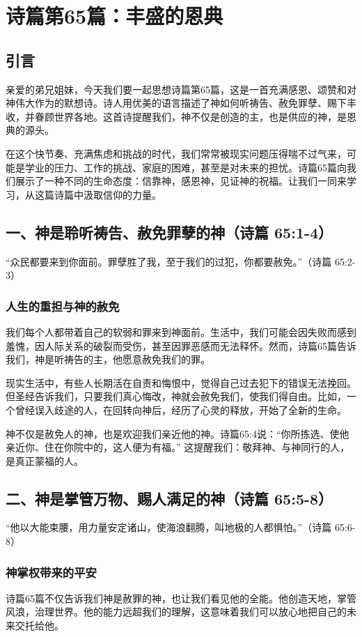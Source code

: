 \documentclass[a4paper, 12pt]{article}
\begin{document}
\section{诗篇第65篇：丰盛的恩典}

\subsection*{引言}
\hspace{0.6cm}亲爱的弟兄姐妹，今天我们要一起思想诗篇第65篇，这是一首充满感恩、颂赞和对神伟大作为的默想诗。诗人用优美的语言描述了神如何听祷告、赦免罪孽、赐下丰收，并眷顾世界各地。这首诗提醒我们，神不仅是创造的主，也是供应的神，是恩典的源头。

在这个快节奏、充满焦虑和挑战的时代，我们常常被现实问题压得喘不过气来，可能是学业的压力、工作的挑战、家庭的困难，甚至是对未来的担忧。诗篇65篇向我们展示了一种不同的生命态度：信靠神，感恩神，见证神的祝福。让我们一同来学习，从这篇诗篇中汲取信仰的力量。
\subsection*{一、神是聆听祷告、赦免罪孽的神（诗篇 65:1-4）}
“众民都要来到你面前。罪孽胜了我，至于我们的过犯，你都要赦免。”（诗篇 65:2-3）
\subsubsection*{人生的重担与神的赦免}
\hspace{0.6cm}我们每个人都带着自己的软弱和罪来到神面前。生活中，我们可能会因失败而感到羞愧，因人际关系的破裂而受伤，甚至因罪恶感而无法释怀。然而，诗篇65篇告诉我们，神是听祷告的主，他愿意赦免我们的罪。

现实生活中，有些人长期活在自责和悔恨中，觉得自己过去犯下的错误无法挽回。但圣经告诉我们，只要我们真心悔改，神就会赦免我们，使我们得自由。比如，一个曾经误入歧途的人，在回转向神后，经历了心灵的释放，开始了全新的生命。

神不仅是赦免人的神，也是欢迎我们亲近他的神。诗篇65:4说：“你所拣选、使他亲近你、住在你院中的，这人便为有福。” 这提醒我们：敬拜神、与神同行的人，是真正蒙福的人。
\subsection*{二、神是掌管万物、赐人满足的神（诗篇 65:5-8）}
“他以大能束腰，用力量安定诸山，使海浪翻腾，叫地极的人都惧怕。”（诗篇 65:6-8）
\subsubsection*{神掌权带来的平安}
\hspace{0.6cm}诗篇65篇不仅告诉我们神是赦罪的神，也让我们看见他的全能。他创造天地，掌管风浪，治理世界。他的能力远超我们的理解，这意味着我们可以放心地把自己的未来交托给他。
\end{document}
